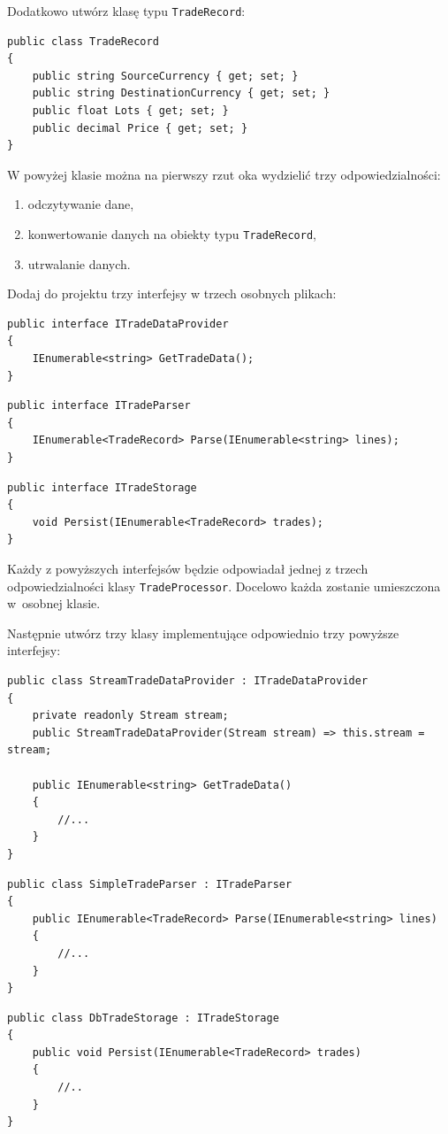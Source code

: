 Dodatkowo utwórz klasę typu \texttt{TradeRecord}:
\begin{lstlisting}[caption={Klasa \texttt{TradeRecord}}]
public class TradeRecord
{
	public string SourceCurrency { get; set; }
	public string DestinationCurrency { get; set; }
	public float Lots { get; set; }
	public decimal Price { get; set; }
}
\end{lstlisting}


W powyżej klasie można na pierwszy rzut oka wydzielić trzy odpowiedzialności:
\begin{enumerate}
	\item odczytywanie dane,
	\item konwertowanie danych na obiekty typu \texttt{TradeRecord},
	\item utrwalanie danych.
\end{enumerate}

Dodaj do projektu trzy interfejsy w trzech osobnych plikach:
\begin{lstlisting}
public interface ITradeDataProvider
{
	IEnumerable<string> GetTradeData();
}
\end{lstlisting}
\begin{lstlisting}
public interface ITradeParser
{
	IEnumerable<TradeRecord> Parse(IEnumerable<string> lines);
}
\end{lstlisting}
\begin{lstlisting}
public interface ITradeStorage
{
	void Persist(IEnumerable<TradeRecord> trades);
}
\end{lstlisting}
Każdy z powyższych interfejsów będzie odpowiadał jednej z trzech odpowiedzialności klasy \texttt{TradeProcessor}. Docelowo każda zostanie umieszczona w~osobnej klasie.

Następnie utwórz trzy klasy implementujące odpowiednio trzy powyższe interfejsy:
\begin{lstlisting}
public class StreamTradeDataProvider : ITradeDataProvider
{
	private readonly Stream stream;
	public StreamTradeDataProvider(Stream stream) => this.stream = stream;
	
	public IEnumerable<string> GetTradeData()
	{
		//...
	}
}
\end{lstlisting}
\begin{lstlisting}
public class SimpleTradeParser : ITradeParser
{	
	public IEnumerable<TradeRecord> Parse(IEnumerable<string> lines)
	{
		//...
	}
}
\end{lstlisting}
\begin{lstlisting}
public class DbTradeStorage : ITradeStorage
{	
	public void Persist(IEnumerable<TradeRecord> trades)
	{
		//..
	}
}
\end{lstlisting}

